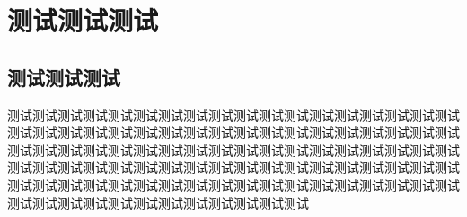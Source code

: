 \section{测试测试测试}
\subsection{测试测试测试}
%
测试测试测试测试测试测试测试测试测试测试测试测试测试测试测试测试测试测试测试测试测试测试测试测试测试测试测试测试测试测试测试测试测试测试测试测试测试测试测试测试测试测试测试测试测试测试测试测试测试测试测试测试测试测试测试测试测试测试测试测试测试测试测试测试测试测试测试测试测试测试测试测试测试测试测试测试测试测试测试测试测试测试测试测试测试测试测试测试测试测试测试测试测试测试测试测试测试测试测试测试测试测试


